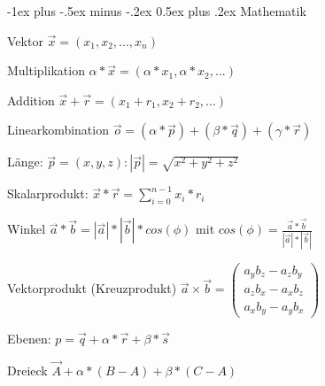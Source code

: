 \documentclass[10pt,landscape]{article}
\makeatletter
\renewcommand{\section}{\@startsection{section}{1}{0mm}%
                                {-1ex plus -.5ex minus -.2ex}%
                                {0.5ex plus .2ex}%
                                {\normalfont\large\bfseries}}
\makeatother
\begin{document}
\raggedright
\footnotesize
\begin{multicols}{3}


\setlength{\premulticols}{1pt}
\setlength{\postmulticols}{1pt}
\setlength{\multicolsep}{1pt}
\setlength{\columnsep}{2pt}

\section{Mathematik}

Vektor $\vec{x}=(x_1,x_2,...,x_n)$

Multiplikation $\alpha * \vec{x} = (\alpha *x_1, \alpha *x_2,...)$

Addition $\vec{x}+\vec{r}=(x_1+r_1, x_2+r_2,...)$

Linearkombination $\vec{o} = (\alpha * \vec{p})+(\beta *\vec{q})+(\gamma * \vec{r})$

Länge: $\vec{p}=(x,y,z): |\vec{p}|=\sqrt{x^2+y^2+z^2}$ 

Skalarprodukt: $\vec{x}*\vec{r}=\sum_{i=0}^{n-1} x_i*r_i$ 

Winkel $\vec{a}*\vec{b}=|\vec{a}|*|\vec{b}|*cos(\phi)$ mit $cos(\phi)=\frac{\vec{a}*\vec{b}}{|\vec{a}|*|\vec{b}|}$

Vektorprodukt (Kreuzprodukt) $\vec{a}\times\vec{b} = \begin{pmatrix} a_y b_z - a_z b_y \\ a_z b_x - a_x b_z \\ a_x b_y - a_y b_x \end{pmatrix}$

Ebenen: $p=\vec{q}+\alpha*\vec{r}+\beta * \vec{s}$

Dreieck $\vec{A}+\alpha*(B-A)+\beta*(C-A)$


\end{multicols}
\end{document}
